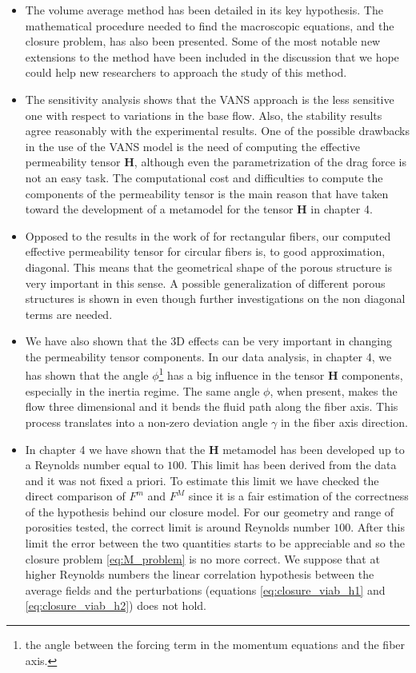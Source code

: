 \begin{itemize}

\item The volume average method has been detailed in its key hypothesis. The mathematical procedure needed to find the macroscopic equations, and the closure problem, has also been presented. Some of the most notable new extensions to the method have been included in the discussion that we hope could help new researchers to approach the study of this method.

\item The sensitivity analysis shows that the VANS approach is the less sensitive one with respect to variations in the base flow. Also, the stability results agree reasonably with the experimental results. One of the possible drawbacks in the use of the VANS model is the need of computing the effective permeability tensor $\mathbf{H}$, although even the parametrization of the drag force is not an easy task. The computational cost and difficulties to compute the components of the permeability tensor is the main reason that have taken toward the development of a metamodel for the tensor $\mathbf{H}$ in chapter 4.
 
\item Opposed to the results in the work of \citet{lasseux} for rectangular fibers, our computed effective permeability tensor for circular fibers is, to good approximation, diagonal. This means that the geometrical shape of the porous structure is very important in this sense. A possible generalization of different porous structures is shown in \citet{pauthenet} even though further investigations on the non diagonal terms are needed.

\item We have also shown that the 3D effects can be very important in changing the permeability tensor components. In our data analysis, in chapter 4, we has shown that the angle $\phi$\footnote{the angle between the forcing term in the momentum equations and the fiber axis.} has a big influence in the tensor $\mathbf{H}$ components, especially in the inertia regime.
The same angle $\phi$, when present, makes the flow three dimensional and it bends the fluid path along the fiber axis. This process translates into a non-zero deviation angle $\gamma$ in the fiber axis direction.

\item In chapter 4 we have shown that the $\mathbf{H}$ metamodel has been developed up to a Reynolds number equal to $100$. This limit has been derived from the data and it was not fixed a priori. To estimate this limit we have checked the direct comparison of $F^m$ and $F^M$ since it is a fair estimation of the correctness of the hypothesis behind our closure model. For our geometry and range of porosities tested, the correct limit is around Reynolds number $100$. After this limit the error between the two quantities starts to be appreciable and so the closure problem \eqref{eq:M_problem} is no more correct. We suppose that at higher Reynolds numbers the linear correlation hypothesis between the average fields and the perturbations (equations \eqref{eq:closure_viab_h1} and \eqref{eq:closure_viab_h2}) does not hold.


\end{itemize}
